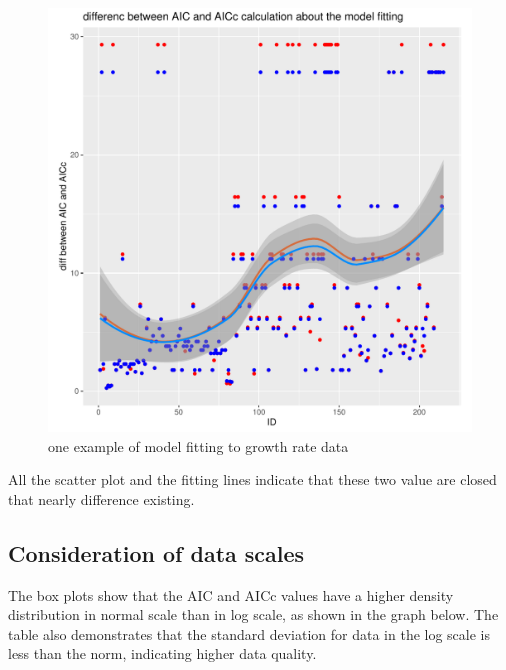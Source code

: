 \documentclass[11pt]{article}
\begin{document}
\begin{figure}[H]
    \centering
    \includegraphics[scale=0.4]{difference_between_AICand AICc.pdf}
    \caption{one example of model fitting to growth rate data}
    \label{fig.6}
\end{figure}

All the scatter plot and the fitting lines indicate that these two value are closed that nearly difference existing.
\subsection{Consideration of data scales}
The box plots show that the AIC and AICc values have a higher density distribution in normal scale than in log scale, as shown in the graph below. The table also demonstrates that the standard deviation for data in the log scale is less than the norm, indicating higher data quality.
\end{document}

